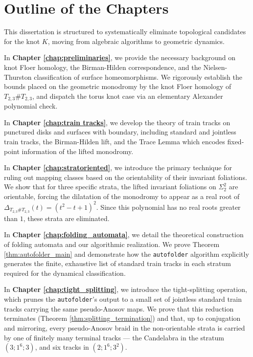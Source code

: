 \section{Outline of the Chapters}

This dissertation is structured to systematically eliminate topological candidates for the knot $K$, moving from algebraic algorithms to geometric dynamics. 

In \textbf{Chapter \ref{chap:preliminaries}}, we provide the necessary background on knot Floer homology, the Birman-Hilden correspondence, and the Nielsen-Thurston classification of surface homeomorphisms. We rigorously establish the bounds placed on the geometric monodromy by the knot Floer homology of $T_{2,3} \# T_{2,3}$, and dispatch the torus knot case via an elementary Alexander polynomial check.

In \textbf{Chapter \ref{chap:train tracks}}, we develop the theory of train tracks on punctured disks and surfaces with boundary, including standard and jointless train tracks, the Birman-Hilden lift, and the Trace Lemma which encodes fixed-point information of the lifted monodromy.

In \textbf{Chapter \ref{chap:stratoriented}}, we introduce the primary technique for ruling out mapping classes based on the orientability of their invariant foliations. We show that for three specific strata, the lifted invariant foliations on $\Sigma_2^2$ are orientable, forcing the dilatation of the monodromy to appear as a real root of $\Delta_{T_{2,3} \# T_{2,3}}(t) = (t^2 - t + 1)^2$. Since this polynomial has no real roots greater than $1$, these strata are eliminated.

In \textbf{Chapter \ref{chap:folding_automata}}, we detail the theoretical construction of folding automata and our algorithmic realization. We prove Theorem \ref{thm:autofolder_main} and demonstrate how the \texttt{autofolder} algorithm explicitly generates the finite, exhaustive list of standard train tracks in each stratum required for the dynamical classification.

In \textbf{Chapter \ref{chap:tight_splitting}}, we introduce the tight-splitting operation, which prunes the \texttt{autofolder}'s output to a small set of jointless standard train tracks carrying the same pseudo-Anosov maps. We prove that this reduction terminates (Theorem \ref{thm:splitting_termination}) and that, up to conjugation and mirroring, every pseudo-Anosov braid in the non-orientable strata is carried by one of finitely many terminal tracks --- the Candelabra in the stratum $(3;1^6;3)$, and six tracks in $(2;1^6;3^2)$.

